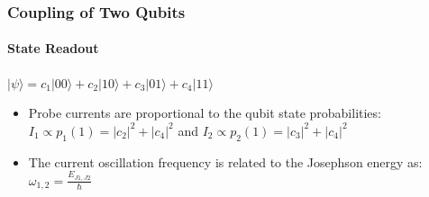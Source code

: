 \documentclass{beamer}
\begin{document}

\begin{frame}
    \frametitle{Coupling of Two Qubits}
    \framesubtitle{State Readout}
    \centering
    $|\psi\rangle=c_1|00\rangle + c_2|10\rangle + c_3|01\rangle + c_4|11\rangle$
    \begin{itemize}
        \item Probe currents are proportional to the qubit state probabilities: $I_1 \propto p_1(1) = |c_2|^2 + |c_4|^2$ and $I_2 \propto p_2(1) = |c_3|^2 + |c_4|^2$
        \item The current oscillation frequency is related to the Josephson energy as: $\omega_{1,2}=\frac{E_{J1,J2}}{\hbar}$
    \end{itemize}
\end{frame}

\end{document}
